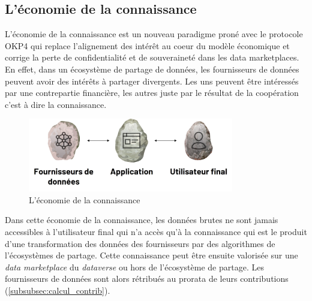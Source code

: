 

\subsection{L'économie de la connaissance} \label{subsec:economie_de_la_connaissance}


L'économie de la connaissance est un nouveau paradigme proné avec le protocole OKP4 qui replace l'alignement des intérêt au coeur du modèle économique et corrige la perte de confidentialité et de souveraineté dans les data marketplaces. En effet, dans un écosystème de partage de données, les fournisseurs de données peuvent avoir des intérêts à partager divergents. Les uns peuvent être intéressés par une contrepartie financière, les autres juste par le résultat de la coopération c'est à dire la connaissance.

\begin{figure}[h]
    \centering
    \includegraphics[width=0.8\textwidth]{ILLUSTRATIONS/kg_economie.jpg}
    \caption{L'économie de la connaissance}
    \label{fig:economie_connaissance}
\end{figure}

Dans cette économie de la connaissance, les données brutes ne sont jamais accessibles à l'utilisateur final qui n'a accès qu'à la connaissance qui est le produit d'une transformation des données des fournisseurs par des algorithmes de l'écosystèmes de partage. Cette connaissance peut être ensuite valorisée sur une \textit{data marketplace} du \textit{dataverse} ou hors de l'écosystème de partage. Les fournisseurs de données sont alors rétribués au prorata de leurs contributions (\ref{subsubsec:calcul_contrib}).

